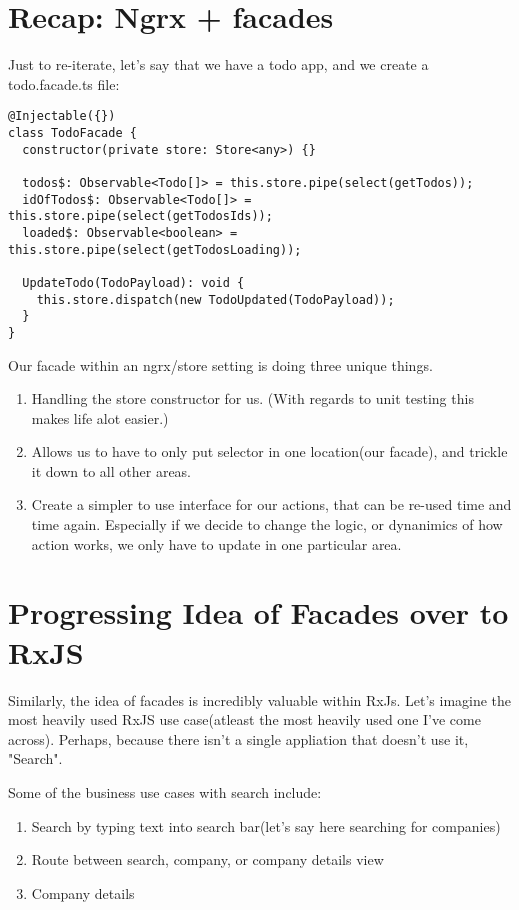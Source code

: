 \section{Recap: Ngrx + facades}
Just to re-iterate, let's say that we have a todo app, and we create a todo.facade.ts file:

\begin{lstlisting}[caption=todo.facade.ts]
@Injectable({})
class TodoFacade {
  constructor(private store: Store<any>) {}

  todos$: Observable<Todo[]> = this.store.pipe(select(getTodos));
  idOfTodos$: Observable<Todo[]> = this.store.pipe(select(getTodosIds));
  loaded$: Observable<boolean> = this.store.pipe(select(getTodosLoading));

  UpdateTodo(TodoPayload): void {
    this.store.dispatch(new TodoUpdated(TodoPayload));
  }
}  
\end{lstlisting}

Our facade within an ngrx/store setting is doing three unique things.
\begin{enumerate}
  \item Handling the store constructor for us. (With regards to unit testing this makes life alot easier.)
  \item Allows us to have to only put selector in one location(our facade), and trickle it down to all other areas. 
  \item Create a simpler to use interface for our actions, that can be re-used time and time again. Especially if we decide to change the logic, or dynanimics of how action works, we only have to update in one particular area. 
\end{enumerate}

\section{Progressing Idea of Facades over to RxJS}
Similarly, the idea of facades is incredibly valuable within RxJs. Let's imagine the most heavily used RxJS use case(atleast the most heavily used one I've come across). Perhaps, because there isn't a single appliation that doesn't use it, "Search".

Some of the business use cases with search include: 
\begin{enumerate}
  \item Search by typing text into search bar(let's say here searching for companies)
  \item Route between search, company, or company details view 
  \item Company details
\end{enumerate}

